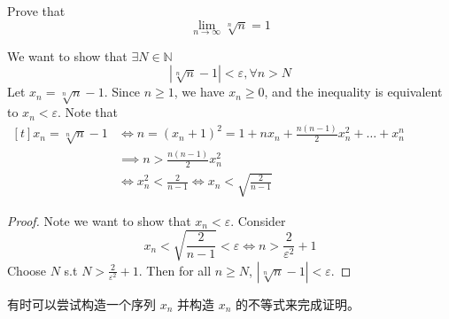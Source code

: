 \documentclass[
	UTF-8,
	11pt, %
	a4paper, %
]{LegrandOrangeBook}
\begin{document}
    \begin{example}[$n$-th Root of $n$]
    Prove that $$\lim_{n \to \infty} \sqrt[n]{n} = 1$$

    \begin{analysis}
        We want to show that $\exists N \in \mathbb{N}$
        $$
        \left| \sqrt[n]{n}-1 \right| < \varepsilon, \forall n > N
        $$
        Let $x_n = \sqrt[n]{n} - 1$. Since $n \ge 1$, we have $x_n \ge 0$, 
        and the inequality is equivalent to $x_n < \varepsilon$. Note that
        $\begin{aligned}[t]
            x_n = \sqrt[n]{n} - 1 &\iff n = (x_n +1 )^2 = 1 + n x_n + \frac{n(n-1)}{2} x_n^2 + \dots + x_n^n \\
            &\implies n > \frac{n(n-1)}{2} x_n^2 \\
            &\iff x_n^2 < \frac{2}{n-1} \iff x_n < \sqrt{\frac{2}{n-1}}
        \end{aligned}$

    \end{analysis}

    \begin{proof}
        Note  we want to show that $x_n < \varepsilon$. Consider
        $$
        x_n < \sqrt{\frac{2}{n-1}} < \varepsilon \iff n > \frac{2}{\varepsilon^2} + 1
        $$
        Choose $N$ s.t $N >\frac{2}{\varepsilon^2} + 1 $. Then for all $n \ge N$, $|\sqrt[n]{n} - 1| < \varepsilon$.
    \end{proof}
    \end{example}

    \begin{remark}
        有时可以尝试构造一个序列 $x_n$ 并构造 $x_n$ 的不等式来完成证明。
    \end{remark}

    \newpage


\end{document}

